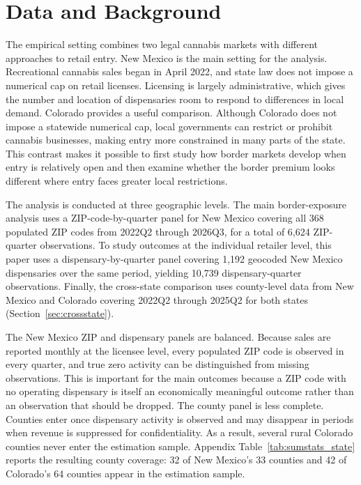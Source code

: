 \documentclass[12pt]{article}
\begin{document}
\section{Data and Background}
\label{sec:data}

The empirical setting combines two legal cannabis markets with different approaches to retail entry. New Mexico is the main setting for the analysis. Recreational cannabis sales began in April 2022, and state law does not impose a numerical cap on retail licenses. Licensing is largely administrative, which gives the number and location of dispensaries room to respond to differences in local demand. Colorado provides a useful comparison. Although Colorado does not impose a statewide numerical cap, local governments can restrict or prohibit cannabis businesses, making entry more constrained in many parts of the state. This contrast makes it possible to first study how border markets develop when entry is relatively open and then examine whether the border premium looks different where entry faces greater local restrictions.

The analysis is conducted at three geographic levels. The main border-exposure analysis uses a ZIP-code-by-quarter panel for New Mexico covering all 368 populated ZIP codes from 2022Q2 through 2026Q3, for a total of 6,624 ZIP-quarter observations. To study outcomes at the individual retailer level, this paper uses a dispensary-by-quarter panel covering 1,192 geocoded New Mexico dispensaries over the same period, yielding 10,739 dispensary-quarter observations. Finally, the cross-state comparison uses county-level data from New Mexico and Colorado covering 2022Q2 through 2025Q2 for both states (Section~\ref{sec:crossstate}).

The New Mexico ZIP and dispensary panels are balanced. Because sales are reported monthly at the licensee level, every populated ZIP code is observed in every quarter, and true zero activity can be distinguished from missing observations. This is important for the main outcomes because a ZIP code with no operating dispensary is itself an economically meaningful outcome rather than an observation that should be dropped. The county panel is less complete. Counties enter once dispensary activity is observed and may disappear in periods when revenue is suppressed for confidentiality. As a result, several rural Colorado counties never enter the estimation sample. Appendix Table~\ref{tab:sumstats_state} reports the resulting county coverage: 32 of New Mexico's 33 counties and 42 of Colorado's 64 counties appear in the estimation sample.
\end{document}
